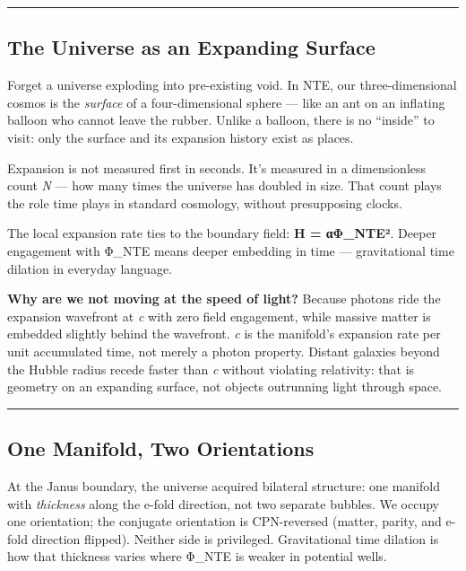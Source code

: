 \documentclass[
  11pt,
]{article}
\begin{document}
\begin{center}\rule{0.5\linewidth}{0.5pt}\end{center}

\subsection{The Universe as an Expanding
Surface}\label{the-universe-as-an-expanding-surface}

Forget a universe exploding into pre-existing void. In NTE, our
three-dimensional cosmos is the \emph{surface} of a four-dimensional
sphere --- like an ant on an inflating balloon who cannot leave the
rubber. Unlike a balloon, there is no ``inside'' to visit: only the
surface and its expansion history exist as places.

Expansion is not measured first in seconds. It's measured in a
dimensionless count \emph{N} --- how many times the universe has doubled
in size. That count plays the role time plays in standard cosmology,
without presupposing clocks.

The local expansion rate ties to the boundary field: \textbf{H =
α\textbar Φ\_NTE\textbar²}. Deeper engagement with
\textbar Φ\_NTE\textbar{} means deeper embedding in time ---
gravitational time dilation in everyday language.

\textbf{Why are we not moving at the speed of light?} Because photons
ride the expansion wavefront at \emph{c} with zero field engagement,
while massive matter is embedded slightly behind the wavefront. \emph{c}
is the manifold's expansion rate per unit accumulated time, not merely a
photon property. Distant galaxies beyond the Hubble radius recede faster
than \emph{c} without violating relativity: that is geometry on an
expanding surface, not objects outrunning light through space.

\begin{center}\rule{0.5\linewidth}{0.5pt}\end{center}

\subsection{One Manifold, Two
Orientations}\label{one-manifold-two-orientations}

At the Janus boundary, the universe acquired bilateral structure: one
manifold with \emph{thickness} along the e-fold direction, not two
separate bubbles. We occupy one orientation; the conjugate orientation
is CPN-reversed (matter, parity, and e-fold direction flipped). Neither
side is privileged. Gravitational time dilation is how that thickness
varies where \textbar Φ\_NTE\textbar{} is weaker in potential wells.
\end{document}

